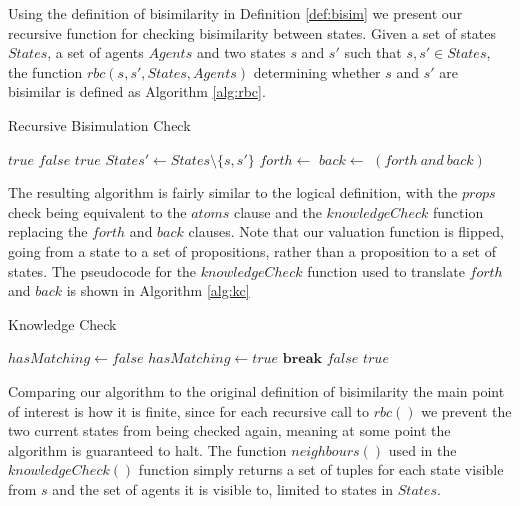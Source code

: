 Using the definition of bisimilarity in Definition \ref{def:bisim} we present our recursive function for checking bisimilarity between states. Given a set of states $States$, a set of agents $Agents$ and two states $s$ and $s'$ such that $s, s' \in States$, the function $rbc(s,s',States, Agents)$ determining whether $s$ and $s'$ are bisimilar is defined as Algorithm \ref{alg:rbc}. 

\begin{algorithm}
\caption{Recursive Bisimulation Check}
\label{alg:rbc}
\begin{algorithmic}[H]
		\State\Return $true$
		\State\Return $false$
		\State\Return $true$
	\Else
		\State $States' \gets States \setminus \{s,s'\}$
		\State $forth \gets$ 
		\State $back \gets$ 
		\State \Return $(forth \ and \ back)$
	\EndIf
\EndFunction
\end{algorithmic}
\end{algorithm}

The resulting algorithm is fairly similar to the logical definition, with the $props$ check being equivalent to the $atoms$ clause and the $knowledgeCheck$ function replacing the $forth$ and $back$ clauses. Note that our valuation function is flipped, going from a state to a set of propositions, rather than a proposition to a set of states. The pseudocode for the $knowledgeCheck$ function used to translate $forth$ and $back$ is shown in Algorithm \ref{alg:kc}

\begin{algorithm}
\caption{Knowledge Check}
\label{alg:kc}
\begin{algorithmic}
			\State $hasMatching \gets false$
					\State $hasMatching \gets true$
					\State $\mathbf{break}$
				\EndIf
			\EndFor
				\State\Return $false$
			\EndIf
		\EndFor	
	\EndFor
	\State \Return $true$ 
\EndFunction
\end{algorithmic}
\end{algorithm}

Comparing our algorithm to the original definition of bisimilarity the main point of interest is how it is finite, since for each recursive call to $rbc()$ we prevent the two current states from being checked again, meaning at some point the algorithm is guaranteed to halt. The function $neighbours()$ used in the $knowledgeCheck()$ function simply returns a set of tuples for each state visible from $s$ and the set of agents it is visible to, limited to states in $States$.

